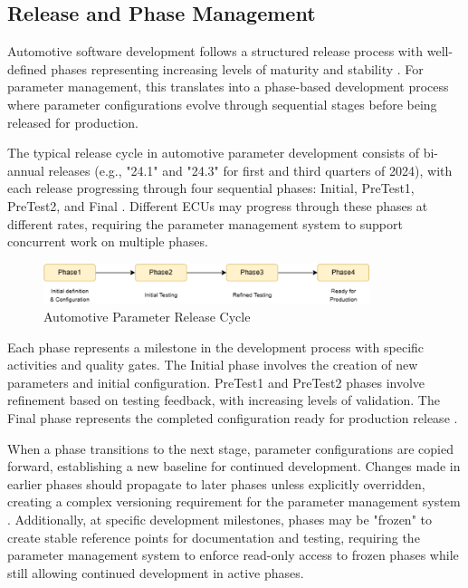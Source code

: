 \subsection{Release and Phase Management}
\label{subsec:release-phase-management}

Automotive software development follows a structured release process with well-defined phases representing increasing levels of maturity and stability \cite{broy2006challenges}. For parameter management, this translates into a phase-based development process where parameter configurations evolve through sequential stages before being released for production.

The typical release cycle in automotive parameter development consists of bi-annual releases (e.g., "24.1" and "24.3" for first and third quarters of 2024), with each release progressing through four sequential phases: Initial, PreTest1, PreTest2, and Final \cite{pretschner2007software}. Different \acp{ECU} may progress through these phases at different rates, requiring the parameter management system to support concurrent work on multiple phases.

\begin{figure}[ht]
    \centering
    \includegraphics[width=0.85\textwidth]{figures/release_cycle.png}
    \caption{Automotive Parameter Release Cycle}
    \label{fig:release-cycle}
\end{figure}

Each phase represents a milestone in the development process with specific activities and quality gates. The Initial phase involves the creation of new parameters and initial configuration. PreTest1 and PreTest2 phases involve refinement based on testing feedback, with increasing levels of validation. The Final phase represents the completed configuration ready for production release \cite{staron2021automotive}.

When a phase transitions to the next stage, parameter configurations are copied forward, establishing a new baseline for continued development. Changes made in earlier phases should propagate to later phases unless explicitly overridden, creating a complex versioning requirement for the parameter management system \cite{pretschner2007software}. Additionally, at specific development milestones, phases may be "frozen" to create stable reference points for documentation and testing, requiring the parameter management system to enforce read-only access to frozen phases while still allowing continued development in active phases.

